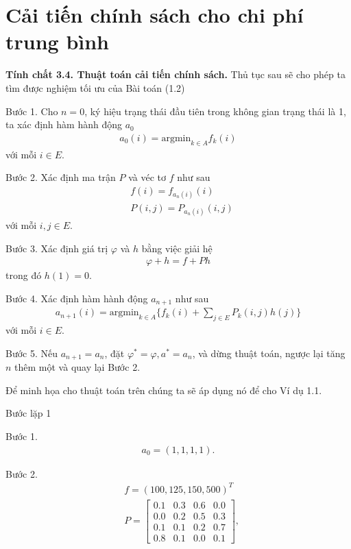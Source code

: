 \documentclass[12pt,a4paper]{report}
\begin{document}
\section{Cải tiến chính sách cho chi phí trung bình}
 \begin{shaded*}
 	\noindent
 	\textbf{Tính chất 3.4. {Thuật toán cải tiến chính sách}.}
 	\selectfont 
 	Thủ tục sau sẽ cho phép ta tìm được nghiệm tối ưu của Bài toán (1.2)
 	
 	\medskip
 	\noindent
 	Bước 1. Cho $n=0$, ký hiệu trạng thái đầu tiên trong không gian trạng thái là 1, ta xác định hàm hành động $a_0$
 	\begin{align*}
 	a_0(i)=\mathrm{argmin}_{k \in A}f_k(i)
 	\end{align*}
 	với mỗi $i \in E$.
 	
 	\medskip
 	\noindent
 	Bước 2. Xác định ma trận $P$ và véc tơ $f$ như sau
 	\begin{align*}
 	&f(i)=f_{a_n(i)}(i)\\
 	&P(i,j)=P_{a_n(i)}(i,j)
 	 \end{align*}
 	 với mỗi $i,j \in E$.
 	
 	\medskip
 	\noindent
 	Bước 3. Xác định giá trị $\varphi$ và $h$ bằng việc giải hệ
 	\begin{align*}
 	\varphi +h=f +Ph
 	\end{align*} 
 	trong đó $h(1)=0$.
 	
 	\medskip
 	\noindent
 	Bước 4. Xác định hàm hành động $a_{n+1}$ như sau
 	\begin{align*}
 	a_{n+1}(i)=\mathrm{argmin}_{k \in A}\{f_k(i)+\sum_{j\in E}P_k(i,j)h(j)\}
 	\end{align*}
 	với mỗi $i \in E$.
 	
 	\medskip
 	\noindent
 	Bước 5.
 	Nếu $a_{n+1}=a_n$, đặt $\varphi^*=\varphi, a^*=a_n$, và dừng thuật toán, ngược lại tăng $n$ thêm một và quay lại Bước 2.
 \end{shaded*}

Để minh họa cho thuật toán trên chúng ta sẽ áp dụng nó để cho Ví dụ 1.1.

\medskip
\noindent
Bước lặp 1

\medskip
\noindent
Bước 1.
\begin{align*}
a_0=(1,1,1,1).
\end{align*}


\medskip
\noindent
Bước 2.
\begin{align*}
&f=(100,125, 150,500)^T\\
&P=\left[
\begin{array}{cccc}
0.1&0.3&0.6&0.0\\
0.0&0.2&0.5&0.3\\
0.1&0.1&0.2&0.7\\
0.8&0.1&0.0&0.1
\end{array}
\right],
\end{align*}
\end{document}
